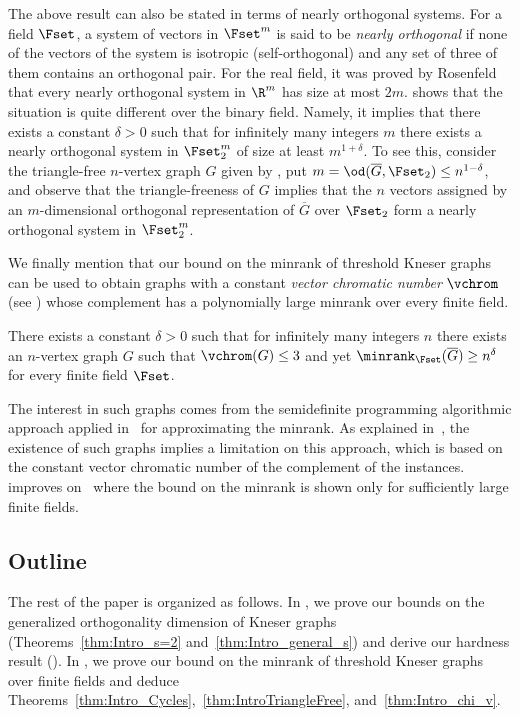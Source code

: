 The above result can also be stated in terms of nearly orthogonal systems.
For a field $\Fset$, a system of vectors in $\Fset^m$ is said to be \emph{nearly
orthogonal} if %
%
none of the vectors of the system is isotropic (self-orthogonal) %
and any set of three of them contains an orthogonal pair.
For the real field, it was proved by Rosenfeld~\cite{Rosenfeld91} that every nearly orthogonal system in $\R^m$ has size at most $2m$.
 shows that the situation is quite different over the binary field. Namely, it implies that there exists a constant $\delta>0$ such that for infinitely many integers $m$ there exists a nearly orthogonal system in $\Fset_2^m$ of size at least $m^{1+\delta}$.
To see this, consider the triangle-free $n$-vertex graph $G$ given by , put $m = \od(\overline{G},\Fset_2) \leq n^{1-\delta}$, and observe that the triangle-freeness of $G$ implies that the $n$ vectors assigned by an $m$-dimensional orthogonal representation of $\overline{G}$ over $\Fset_2$ form a nearly orthogonal system in $\Fset_2^m$.

We finally mention that our bound on the minrank
%
%
%
of threshold Kneser graphs  %
can be used to obtain graphs with a constant \emph{vector chromatic number} $\vchrom$ (see ) whose complement has a polynomially large minrank over every finite field.
\begin{theorem}\label{thm:Intro_chi_v}
There exists a constant $\delta >0$ such that for infinitely many integers $n$ there exists an $n$-vertex graph $G$ such that $\vchrom(G) \leq 3$ and yet $\minrank_{\Fset}(\overline{G}) \geq n^\delta$ for every finite field $\Fset$.
\end{theorem}
\noindent
The interest in such graphs comes from the semidefinite programming algorithmic approach applied in~\cite{ChlamtacH14} for approximating the minrank.
%
%
As explained in~\cite{Haviv18}, %
%
the existence of such graphs implies  %
a limitation on this approach, which is based on the constant vector chromatic number of the complement of the instances.  improves on~\cite[Theorem~1.3]{Haviv18} where the bound on the minrank is shown only for sufficiently large finite fields.

\subsection{Outline}
The rest of the paper is organized as follows.
In , we prove our bounds on the generalized orthogonality dimension
%
%
of Kneser graphs (Theorems~\ref{thm:Intro_s=2} and~\ref{thm:Intro_general_s}) and derive our hardness result ().
In , we prove our bound on the minrank
%
%
of threshold Kneser graphs  %
over finite fields  %
and deduce Theorems~\ref{thm:Intro_Cycles},~\ref{thm:IntroTriangleFree}, and~\ref{thm:Intro_chi_v}.

